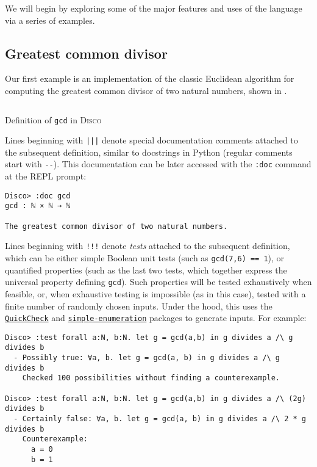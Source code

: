 \documentclass[submission,copyright,creativecommons]{eptcs}
\newcommand{\disco}{\textsc{Disco}\xspace}
\newcommand{\pkg}[1]{\href{https://hackage.haskell.org/package/#1}{\texttt{#1}}}
\newcommand{\pref}[1]{\prettyref{#1}}
\begin{document}
We will begin by exploring some of the major features and uses of the
language via a series of examples.

\subsection{Greatest common divisor}
\label{sec:gcd}

Our first example is an implementation of the classic Euclidean
algorithm for computing the greatest common divisor of two natural
numbers, shown in \pref{lst:gcd}.

\begin{listing}[!htp]
\inputminted{text}{examples/gcd.disco}
\caption{Definition of \texttt{gcd} in \disco}
\label{lst:gcd}
\end{listing}

Lines beginning with \texttt{|||} denote special documentation
comments attached to the subsequent definition, similar to docstrings
in Python (regular comments start with \texttt{-{}-}).  This
documentation can be later accessed with the \texttt{:doc} command at
the REPL prompt:

\begin{verbatim}
Disco> :doc gcd
gcd : ℕ × ℕ → ℕ

The greatest common divisor of two natural numbers.

\end{verbatim}

Lines beginning with \texttt{!!!} denote \emph{tests} attached to the
subsequent definition, which can be either simple Boolean unit tests
(such as \verb|gcd(7,6) == 1|), or quantified properties (such as the
last two tests, which together express the universal property defining
\verb|gcd|).  Such properties will be tested exhaustively when
feasible, or, when exhaustive testing is impossible (as in this case),
tested with a finite number of randomly chosen inputs. Under the hood,
this uses the \pkg{QuickCheck} \cite{claessen2000quickcheck} and
\pkg{simple-enumeration} packages to generate inputs.  For example:

\begin{verbatim}
Disco> :test forall a:N, b:N. let g = gcd(a,b) in g divides a /\ g divides b
  - Possibly true: ∀a, b. let g = gcd(a, b) in g divides a /\ g divides b
    Checked 100 possibilities without finding a counterexample.

Disco> :test forall a:N, b:N. let g = gcd(a,b) in g divides a /\ (2g) divides b
  - Certainly false: ∀a, b. let g = gcd(a, b) in g divides a /\ 2 * g divides b
    Counterexample:
      a = 0
      b = 1
\end{verbatim}
\end{document}
